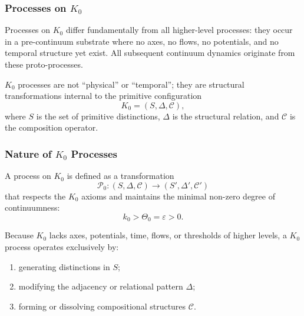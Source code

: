 

\subsubsection{Processes on \texorpdfstring{$K_0$}{K_0}}
\label{sec:processes-k0}

Processes on $K_0$ differ fundamentally from all higher-level processes:
they occur in a pre-continuum substrate where no axes, no flows,
no potentials, and no temporal structure yet exist.
All subsequent continuum dynamics originate from these proto-processes.

$K_0$ processes are not ``physical'' or ``temporal''; they are structural
transformations internal to the primitive configuration
\[
K_0 = (S, \Delta, \mathcal{C}),
\]
where $S$ is the set of primitive distinctions, $\Delta$ is the structural
relation, and $\mathcal{C}$ is the composition operator.

\subsubsection{Nature of \texorpdfstring{$K_0$}{K_0} Processes}

A process on $K_0$ is defined as a transformation
\[
\mathcal{P}_0: (S, \Delta, \mathcal{C}) \longrightarrow (S', \Delta', \mathcal{C}')
\]
that respects the $K_0$ axioms and maintains the minimal non-zero degree of
continuumness:
\[
k_0 > \Theta_0 = \varepsilon > 0.
\]

Because $K_0$ lacks axes, potentials, time, flows, or thresholds of higher
levels, a $K_0$ process operates exclusively by:

\begin{enumerate}
    \item generating distinctions in $S$;
    \item modifying the adjacency or relational pattern $\Delta$;
    \item forming or dissolving compositional structures $\mathcal{C}$.
\end{enumerate}


